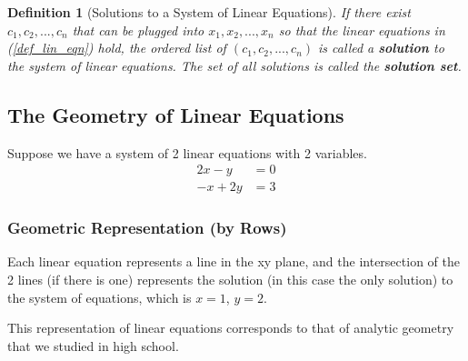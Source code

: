 \documentclass{article}
\newtheorem{definition}{Definition}[section] %
\begin{document}
\begin{definition}[Solutions to a System of Linear Equations]
If there exist \(c_1, c_2, ..., c_n\) that can be plugged into \(x_1, x_2, ..., x_n\) so that the linear equations in (\ref{def_lin_eqn}) hold, the ordered list of \((c_1, c_2, ..., c_n)\) is called a \textbf{solution} to the system of linear equations. The set of all solutions is called the \textbf{solution set}.
\end{definition}

\subsection{The Geometry of Linear Equations}
Suppose we have a system of 2 linear equations with 2 variables.
    \begin{equation}\label{ex_lin_eqn}
    \begin{split}
    2x-y&=0 \\
    -x+2y&=3
    \end{split}
    \end{equation}
\subsubsection{Geometric Representation (by Rows)}
Each linear equation represents a line in the xy plane, and the intersection of the 2 lines (if there is one) represents the solution (in this case the only solution) to the system of equations, which is \(x=1\), \(y=2\).

\begin{center}
\end{center}

This representation of linear equations corresponds to that of analytic geometry that we studied in high school.
\end{document}
